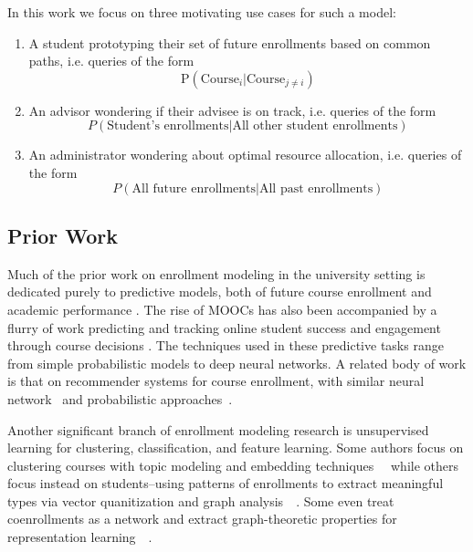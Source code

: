 \documentclass{edm_template}
\begin{document}
In this work we focus on three motivating use cases for such a model:
\begin{enumerate}[noitemsep,topsep=0pt]
	\item A student prototyping their set of future enrollments based on common paths, i.e. queries of the form
	$$\text{P}(\text{Course}_i | \text{Course}_{j \neq i})$$ 
	\item An advisor wondering if their advisee is on track, i.e. queries of the form
	$$P(\text{Student's enrollments} | \text{All other student enrollments})$$
	\item An administrator wondering about optimal resource allocation, i.e. queries of the form
	$$P(\text{All future enrollments} | \text{All past enrollments})$$
\end{enumerate}

\subsection{Prior Work}

Much of the prior work on enrollment modeling in the university setting is dedicated purely to predictive models, both of future course enrollment \cite{kardan2013prediction}\cite{nandeshwar2009enrollment}\cite{song1993new} and academic performance \cite{kovacic2010early}\cite{hlosta2017ouroboros}. The rise of MOOCs has also been accompanied by a flurry of work predicting and tracking online student success and engagement through course decisions \cite{balakrishnan2013predicting}\cite{Gardner2018StudentSP}\cite{AlShabandar2018TheAO}. The techniques used in these predictive tasks range from simple probabilistic models to deep neural networks. A related body of work is that on recommender systems for course enrollment, with similar neural network~\cite{Jiang2018GoalbasedCR} and probabilistic approaches~\cite{Khorasani2016AMC}. 

Another significant branch of enrollment modeling research is unsupervised learning for clustering, classification, and feature learning. Some authors focus on clustering courses with topic modeling and embedding techniques~\cite{Motz2018FindingTI}~\cite{Pardos2018AMO} while others focus instead on students--using patterns of enrollments to extract meaningful types via vector quanitization and graph analysis~\cite{Zeidenberg2011TheCO}~\cite{Slim2016TheIO}. Some even treat coenrollments as a network and extract graph-theoretic properties for representation learning~\cite{gardner2018coenrollment}~\cite{Wang2017AnalyzingCC}. 
\end{document}
